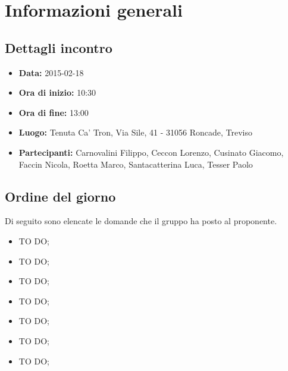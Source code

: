 %


\section{Informazioni generali} %
\label{sec:informazioni_generali}
	\subsection{Dettagli incontro} %
	\label{sub:dettagli_incontro}
		\begin{itemize}
			\item \textbf{Data:} 2015-02-18
			\item \textbf{Ora di inizio:} 10:30
			\item \textbf{Ora di fine:} 13:00
			\item \textbf{Luogo:} Tenuta Ca' Tron, Via Sile, 41 - 31056 Roncade, Treviso
			\item \textbf{Partecipanti:} Carnovalini Filippo, Ceccon Lorenzo, Cusinato Giacomo, Faccin Nicola, Roetta Marco, Santacatterina Luca, Tesser Paolo
		\end{itemize}
	
	\subsection{Ordine del giorno} %
	\label{sub:ordine_del_giorno}
	Di seguito sono elencate le domande che il gruppo ha posto al proponente.
		\begin{itemize}
			\item TO DO;
			\item TO DO;
			\item TO DO;
			\item TO DO;
			\item TO DO;
			\item TO DO;
			\item TO DO;
		\end{itemize}
